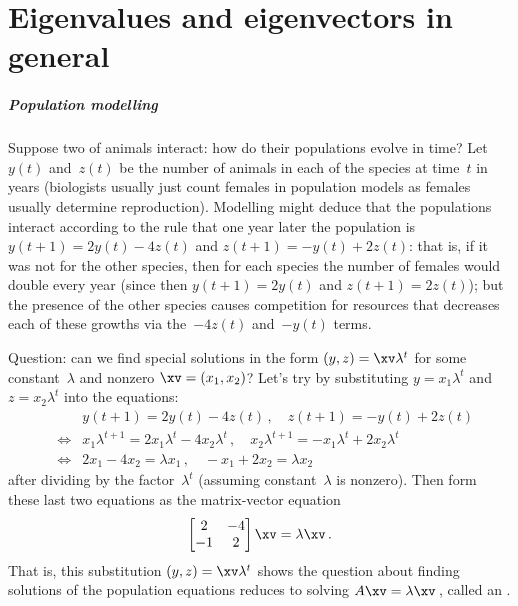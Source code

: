 
\chapter{Eigenvalues and eigenvectors in general}
\label{ch:gee}

\minitoc





\paragraph{Population modelling} 
Suppose two  of animals interact: how do their populations evolve in time?  
Let \(y(t)\) and~\(z(t)\) be the number of  animals in each of the species at time~\(t\) in years (biologists usually just count females in population models as females usually determine reproduction). 
Modelling might deduce that the populations interact according to the rule that one year later the population is \(y(t+1)=2y(t)-4z(t)\) and \(z(t+1)=-y(t)+2z(t)\): that is, if it was not for the other species, then for each species the number of females would double every year (since then \(y(t+1)=2y(t)\) and \(z(t+1)=2z(t)\)); but the presence of the other species causes competition for resources that decreases each of these growths via the~\(-4z(t)\) and~\(-y(t)\) terms.  

Question: can we find special solutions in the form \((y,z)=\xv \lambda^{t}\) for some constant~\(\lambda\) and nonzero \(\xv=(x_1,x_2)\)?  
Let's try by substituting \(y=x_1\lambda^{t}\) and \(z=x_2\lambda^{t}\) into the  equations:
\begin{eqnarray*}
&&y(t+1)=2y(t)-4z(t)\,,\quad z(t+1)=-y(t)+2z(t)
\\&\iff& 
x_1 \lambda^{t+1}=2x_1\lambda^{t}-4x_2\lambda^{t}
\,,\quad
x_2 \lambda^{t+1}=-x_1\lambda^{t}+2x_2\lambda^{t}
\\&\iff& 2x_1-4x_2=\lambda x_1
\,,\quad
-x_1+2x_2=\lambda x_2
\end{eqnarray*}
after dividing by the factor~\(\lambda^{t}\) (assuming constant~\(\lambda\) is nonzero).
Then form these last two equations as the matrix-vector equation
\begin{equation*}
\begin{bmatrix} 2&-4\\-1&2 \end{bmatrix}\xv=\lambda\xv\,.
\end{equation*}
That is, this substitution \((y,z)=\xv \lambda^{t}\) shows the question about finding solutions of the population equations reduces to solving \(A\xv=\lambda \xv\)\,, called an .

